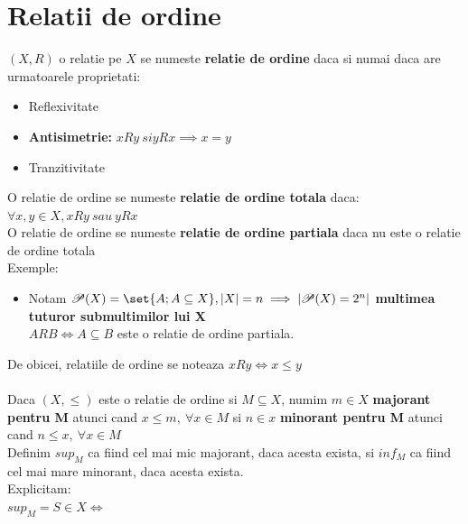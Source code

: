 \documentclass{article}
\begin{document}
    \section{Relatii de ordine}
        $(X,R)$ o relatie pe $X$ se numeste \textbf{relatie de ordine} daca si numai daca are urmatoarele proprietati:
        \begin{itemize}
            \item Reflexivitate
            \item \textbf{Antisimetrie:} $xRy\ si yRx \implies x=y$
            \item Tranzitivitate
        \end{itemize}
        O relatie de ordine se numeste \textbf{relatie de ordine totala} daca:\\ $\forall x,y \in X, xRy\ sau\ yRx$ \\
        O relatie de ordine se numeste \textbf{relatie de ordine partiala} daca nu este o relatie de ordine totala\\
        Exemple:
        \begin{itemize}
            \item Notam $\mathscr{P}(X) = \set{A;A\subseteq X}, |X| = n \implies |\mathscr{P}(X) = 2^n|$ \textbf{multimea tuturor submultimilor lui X}\\
            $ARB \iff A \subseteq B$ este o relatie de ordine partiala.
        \end{itemize}
        De obicei, relatiile de ordine se noteaza $xRy \iff x \leq y$\\ \\
        Daca $(X,\leq)$ este o relatie de ordine si $M \subseteq X$, numim $m\in X$ \textbf{majorant pentru M} atunci cand $x \leq m,\ \forall x \in M$ si $n \in x$ \textbf{minorant pentru M} atunci cand $n \leq x,\ \forall x \in M$\\
        Definim $sup_M$ ca fiind cel mai mic majorant, daca acesta exista, si $inf_M$ ca fiind cel mai mare minorant, daca acesta exista.\\
        Explicitam:\\
        $sup_M = S \in X \iff$
\end{document}
